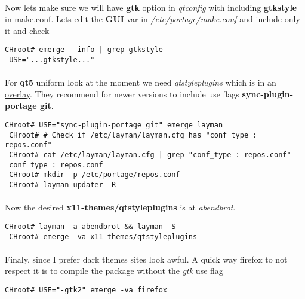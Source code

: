 \documentclass[10pt,a4paper]{article}
\begin{document}
                    \paragraph{} Now lets make sure we will have \textbf{gtk} option in \textit{qtconfig} with including \textbf{gtkstyle} in make.conf. Lets edit the \textbf{GUI} var in \textit{/etc/portage/make.conf} and include only it and check
                    
                    \begin{lstlisting}[style=BashInputCHRoot]
 CHroot# emerge --info | grep gtkstyle
 USE="...gtkstyle..."
                    \end{lstlisting}
                    
                    \paragraph{} For \textbf{qt5} uniform look at the moment we need \textit{qtstyleplugins} which is in an \href{https://wiki.gentoo.org/wiki/Layman}{overlay}. They recommend for newer versions to include use flags \textbf{sync-plugin-portage git}.
                    
                    \begin{lstlisting}[style=BashInputCHRoot]
 CHroot# USE="sync-plugin-portage git" emerge layman
 CHroot# # Check if /etc/layman/layman.cfg has "conf_type : repos.conf"
 CHroot# cat /etc/layman/layman.cfg | grep "conf_type : repos.conf"
 conf_type : repos.conf
 CHroot# mkdir -p /etc/portage/repos.conf
 CHroot# layman-updater -R
                    \end{lstlisting}
                    
                    \paragraph{} Now the desired \textbf{x11-themes/qtstyleplugins} is at \textit{abendbrot}.
                    
                    \begin{lstlisting}[style=BashInputCHRoot]
 CHroot# layman -a abendbrot && layman -S
 CHroot# emerge -va x11-themes/qtstyleplugins
                    \end{lstlisting}
                    
                    \paragraph{} Finaly, since I prefer dark themes sites look awful. A quick way firefox to not respect it is to compile the package without the \textit{gtk} use flag
                    
                    \begin{lstlisting}[style=BashInputCHRoot]
 CHroot# USE="-gtk2" emerge -va firefox
                    \end{lstlisting}
\end{document}

